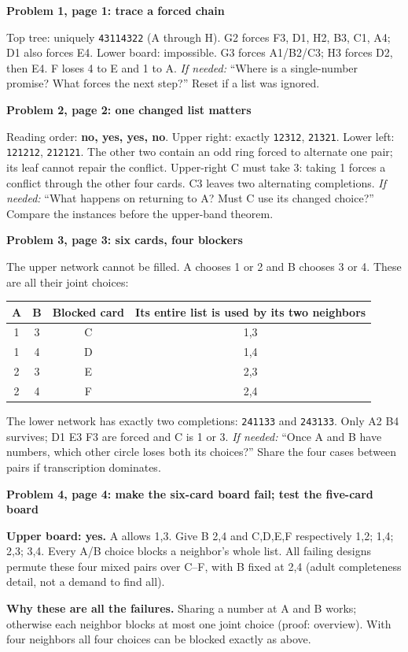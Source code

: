 \documentclass[10pt]{article}
\newcommand{\sub}[1]{\par\textbf{#1}\par}
\newcommand{\hint}[1]{\textit{If needed:} #1}
\newcommand{\word}[1]{\texttt{#1}}
\begin{document}
\sub{Problem 1, page 1: trace a forced chain}
Top tree: uniquely \word{43114322} (A through H). G2 forces F3, D1, H2, B3, C1, A4; D1 also forces E4. Lower board: impossible. G3 forces A1/B2/C3; H3 forces D2, then E4. F loses 4 to E and 1 to A. \hint{``Where is a single-number promise? What forces the next step?''} Reset if a list was ignored.

\sub{Problem 2, page 2: one changed list matters}
Reading order: \textbf{no, yes, yes, no}. Upper right: exactly \word{12312}, \word{21321}. Lower left: \word{121212}, \word{212121}. The other two contain an odd ring forced to alternate one pair; its leaf cannot repair the conflict. Upper-right C must take 3: taking 1 forces a conflict through the other four cards. C3 leaves two alternating completions. \hint{``What happens on returning to A? Must C use its changed choice?''} Compare the instances before the upper-band theorem.

\sub{Problem 3, page 3: six cards, four blockers}
The upper network cannot be filled. A chooses 1 or 2 and B chooses 3 or 4. These are all their joint choices:
\begin{center}\renewcommand{\arraystretch}{1.2}
\begin{tabular}{cccc}
A & B & Blocked card & Its entire list is used by its two neighbors\\\midrule
1&3&C&1,3\\
1&4&D&1,4\\
2&3&E&2,3\\
2&4&F&2,4\\
\end{tabular}\end{center}
The lower network has exactly two completions: \word{241133} and \word{243133}. Only A2 B4 survives; D1 E3 F3 are forced and C is 1 or 3.  \hint{``Once A and B have numbers, which other circle loses both its choices?''} Share the four cases between pairs if transcription dominates.

\sub{Problem 4, page 4: make the six-card board fail; test the five-card board}
\textbf{Upper board: yes.} A allows 1,3. Give B 2,4 and C,D,E,F respectively 1,2; 1,4; 2,3; 3,4. Every A/B choice blocks a neighbor's whole list. All failing designs permute these four mixed pairs over C--F, with B fixed at 2,4 (adult completeness detail, not a demand to find all).

\textbf{Why these are all the failures.} Sharing a number at A and B works; otherwise each neighbor blocks at most one joint choice (proof: overview). With four neighbors all four choices can be blocked exactly as above.
\end{document}
